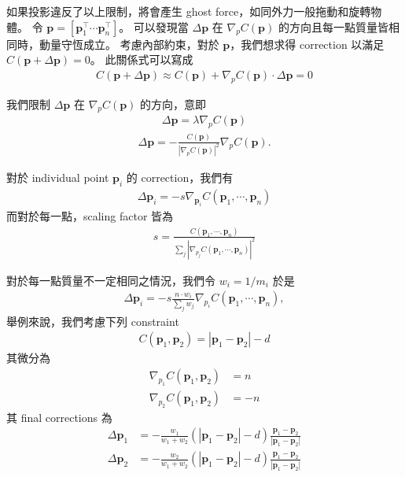\documentclass{article}
\begin{document}
如果投影違反了以上限制，將會產生 ghost force，如同外力一般拖動和旋轉物體。
令 $\mathbf{p} = \left[ \mathbf{p}^\top_1 \cdots \mathbf{p}^\top_n  \right] $。
可以發現當 $\Delta \mathbf{p}$ 在 $\nabla_p C(\mathbf{p})$ 的方向且每一點質量皆相同時，動量守恆成立。
考慮內部約束，對於 $\mathbf{p}$，我們想求得 correction 以滿足 $ C(\mathbf{p}+ \Delta \mathbf{p}) = 0$。
此關係式可以寫成
\begin{align}
  C(\mathbf{p}+ \Delta \mathbf{p}) \approx C(\mathbf{p}) + \nabla_p C(\mathbf{p}) \cdot \Delta \mathbf{p} = 0
\end{align}

我們限制 $\Delta \mathbf{p}$ 在 $\nabla_p C(\mathbf{p})$ 的方向，意即
\begin{align}
  \Delta \mathbf{p} = \lambda \nabla_p C(\mathbf{p})
\end{align}
\begin{align}
  \Delta \mathbf{p} = - \frac{C(\mathbf{p})}{\left|\nabla_p C(\mathbf{p})\right|^2}  \nabla_p C(\mathbf{p}).
\end{align}

對於 individual point $\mathbf{p}_i$ 的  correction，我們有
\begin{align}
  \Delta \mathbf{p}_i = -s \nabla_{\mathbf{p}_i} C(\mathbf{p}_1, \cdots , \mathbf{p}_n)
\end{align}
而對於每一點，scaling factor 皆為
\begin{align}
  s = \frac{C(\mathbf{p}_1 , \cdots , \mathbf{p}_n) }{\sum_j \left|\nabla_{p_j}  C(\mathbf{p}_1 , \cdots , \mathbf{p}_n) \right|^2 }
\end{align}

對於每一點質量不一定相同之情況，我們令 $w_i = 1 / m_i$ 於是
\begin{align}
  \Delta \mathbf{p}_i = -s \frac{n \cdot w_i}{\sum_j w_j} \nabla_{p_i} C(\mathbf{p}_1 , \cdots , \mathbf{p}_n),
\end{align}
舉例來說，我們考慮下列 constraint
\begin{align}
  C ( \mathbf{p}_1 , \mathbf{p}_2) = \left|\mathbf{p}_1 - \mathbf{p}_2\right| -d
\end{align}
其微分為
\begin{align}
  \nabla_{p_1} C(\mathbf{p}_1 , \mathbf{p}_2) & = n  \\
  \nabla_{p_2} C(\mathbf{p}_1 , \mathbf{p}_2) & = -n
\end{align}
其 final corrections 為
\begin{align}
  \Delta \mathbf{p}_1 & = - \frac{w_1}{w_1+ w_2} \left( \left|\mathbf{p}_1 - \mathbf{p}_2\right| -d \right) \frac{\mathbf{p}_1 - \mathbf{p}_2}{\left|\mathbf{p}_1 - \mathbf{p}_2\right|} \\
  \Delta \mathbf{p}_2 & = - \frac{w_2}{w_1+ w_2} \left( \left|\mathbf{p}_1 - \mathbf{p}_2\right| -d \right) \frac{\mathbf{p}_1 - \mathbf{p}_2}{\left|\mathbf{p}_1 - \mathbf{p}_2\right|}
\end{align}
\end{document}
